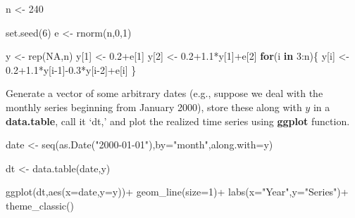 \documentclass[
  oneside]{book}
\newenvironment{Shaded}{\begin{snugshade}}{\end{snugshade}}
\newcommand{\AttributeTok}[1]{\textcolor[rgb]{0.77,0.63,0.00}{#1}}
\newcommand{\ConstantTok}[1]{\textcolor[rgb]{0.00,0.00,0.00}{#1}}
\newcommand{\ControlFlowTok}[1]{\textcolor[rgb]{0.13,0.29,0.53}{\textbf{#1}}}
\newcommand{\DecValTok}[1]{\textcolor[rgb]{0.00,0.00,0.81}{#1}}
\newcommand{\FloatTok}[1]{\textcolor[rgb]{0.00,0.00,0.81}{#1}}
\newcommand{\FunctionTok}[1]{\textcolor[rgb]{0.00,0.00,0.00}{#1}}
\newcommand{\NormalTok}[1]{#1}
\newcommand{\OtherTok}[1]{\textcolor[rgb]{0.56,0.35,0.01}{#1}}
\newcommand{\SpecialCharTok}[1]{\textcolor[rgb]{0.00,0.00,0.00}{#1}}
\newcommand{\StringTok}[1]{\textcolor[rgb]{0.31,0.60,0.02}{#1}}
\begin{document}
\begin{Shaded}
\begin{Highlighting}[]
\NormalTok{n }\OtherTok{\textless{}{-}} \DecValTok{240}

\FunctionTok{set.seed}\NormalTok{(}\DecValTok{6}\NormalTok{)}
\NormalTok{e }\OtherTok{\textless{}{-}} \FunctionTok{rnorm}\NormalTok{(n,}\DecValTok{0}\NormalTok{,}\DecValTok{1}\NormalTok{)}

\NormalTok{y }\OtherTok{\textless{}{-}} \FunctionTok{rep}\NormalTok{(}\ConstantTok{NA}\NormalTok{,n)}
\NormalTok{y[}\DecValTok{1}\NormalTok{] }\OtherTok{\textless{}{-}} \FloatTok{0.2}\SpecialCharTok{+}\NormalTok{e[}\DecValTok{1}\NormalTok{]}
\NormalTok{y[}\DecValTok{2}\NormalTok{] }\OtherTok{\textless{}{-}} \FloatTok{0.2+1.1}\SpecialCharTok{*}\NormalTok{y[}\DecValTok{1}\NormalTok{]}\SpecialCharTok{+}\NormalTok{e[}\DecValTok{2}\NormalTok{]}
\ControlFlowTok{for}\NormalTok{(i }\ControlFlowTok{in} \DecValTok{3}\SpecialCharTok{:}\NormalTok{n)\{}
\NormalTok{  y[i] }\OtherTok{\textless{}{-}} \FloatTok{0.2+1.1}\SpecialCharTok{*}\NormalTok{y[i}\DecValTok{{-}1}\NormalTok{]}\SpecialCharTok{{-}}\FloatTok{0.3}\SpecialCharTok{*}\NormalTok{y[i}\DecValTok{{-}2}\NormalTok{]}\SpecialCharTok{+}\NormalTok{e[i]}
\NormalTok{\}}
\end{Highlighting}
\end{Shaded}

Generate a vector of some arbitrary dates (e.g., suppose we deal with the monthly series beginning from January 2000), store these along with \(y\) in a \textbf{data.table}, call it `dt,' and plot the realized time series using \textbf{ggplot} function.

\begin{Shaded}
\begin{Highlighting}[]
\NormalTok{date }\OtherTok{\textless{}{-}} \FunctionTok{seq}\NormalTok{(}\FunctionTok{as.Date}\NormalTok{(}\StringTok{"2000{-}01{-}01"}\NormalTok{),}\AttributeTok{by=}\StringTok{"month"}\NormalTok{,}\AttributeTok{along.with=}\NormalTok{y)}

\NormalTok{dt }\OtherTok{\textless{}{-}} \FunctionTok{data.table}\NormalTok{(date,y)}

\FunctionTok{ggplot}\NormalTok{(dt,}\FunctionTok{aes}\NormalTok{(}\AttributeTok{x=}\NormalTok{date,}\AttributeTok{y=}\NormalTok{y))}\SpecialCharTok{+}
  \FunctionTok{geom\_line}\NormalTok{(}\AttributeTok{size=}\DecValTok{1}\NormalTok{)}\SpecialCharTok{+}
  \FunctionTok{labs}\NormalTok{(}\AttributeTok{x=}\StringTok{"Year"}\NormalTok{,}\AttributeTok{y=}\StringTok{"Series"}\NormalTok{)}\SpecialCharTok{+}
  \FunctionTok{theme\_classic}\NormalTok{()}
\end{Highlighting}
\end{Shaded}
\end{document}
